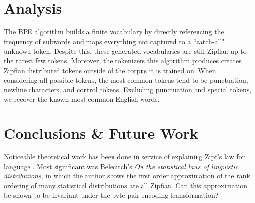 \documentclass[11pt]{article}
\begin{document}


\section{Analysis}

The BPE algorithm builds a finite vocabulary by directly referencing the frequency of subwords and maps everything not captured to a ``catch-all" unknown token. Despite this, these generated vocabularies are still Zipfian up to the rarest few tokens. Moreover, the tokenizers this algorithm produces creates Zipfian distributed tokens outside of the corpus it is trained on. When considering all possible tokens, the most common tokens tend to be punctuation, newline characters, and control tokens. Excluding punctuation and special tokens, we recover the known most common English words. 

\section{Conclusions \& Future Work}

Noticeable theoretical work has been done in service of explaining Zipf's law for language \cite{li1992}. Most significant was Belecitch's \textit{On the statistical laws of linguistic distributions}\cite{Belevitch1959}, in which the author shows the first order approximation of the rank ordering of many statistical distributions are all Zipfian. Can this approximation be shown to be invariant under the byte pair encoding transformation?

%




\end{document}
